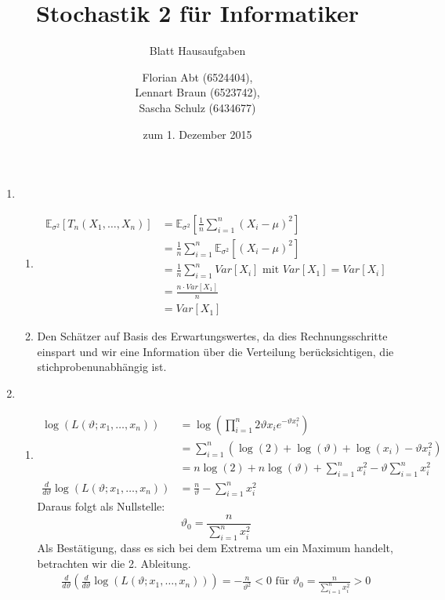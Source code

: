 \documentclass[a4paper]{scrartcl}
\title{Stochastik 2 für Informatiker}
\subtitle{Blatt {\blattnr} Hausaufgaben}
\author{
    Florian Abt (6524404), \\
    Lennart Braun (6523742), \\
    Sascha Schulz (6434677)
}
\date{zum 1. Dezember 2015}
\def \blattnr {7}
\begin{document}
\maketitle

\begin{enumerate}[label=\bfseries \blattnr.\arabic*]


\item 
\begin{enumerate}
\item 
\begin{equation*}
 \begin{split}
    \mathbb{E}_{\sigma^2}[T_n(X_1,\ldots,X_n)]
    &= \mathbb{E}_{\sigma^2}\left[\frac1n \sum_{i=1}^n(X_i-\mu)^2\right] \\
    &= \frac1n \sum_{i=1}^n \mathbb{E}_{\sigma^2} [(X_i-\mu)^2] \\
    &= \frac1n \sum_{i=1}^n Var[X_i] \text{ mit } Var[X_1]=Var[X_i] \\
    &= \frac{n \cdot Var[X_1]}n \\
    &= Var[X_1]
  \end{split}
\end{equation*}

\item 
  Den Schätzer auf Basis des Erwartungswertes, da dies Rechnungsschritte einspart und wir eine
  Information über die Verteilung berücksichtigen, die stichprobenunabhängig ist.
\end{enumerate}

\item 
\begin{enumerate}
\item 

\begin{equation*}
 \begin{split}
   \log \left( L(\vartheta;x_1,\ldots,x_n) \right)
   &= \log \left( \prod_{i=1}^n 2\vartheta x_i e^{-\vartheta x_i^2} \right) \\
   &= \sum_{i=1}^n \left( \log(2) + \log(\vartheta) + \log(x_i) -\vartheta x_i^2 \right) \\
   &= n\log(2) + n\log(\vartheta) + \sum_{i=1}^n x_i^2 - \vartheta \sum_{i=1}^n x_i^2 \\   
   \frac{d}{d\vartheta} \log \left( L(\vartheta;x_1,\ldots,x_n) \right)
   &= \frac{n}\vartheta - \sum_{i=1}^n x_i^2
  \end{split}
\end{equation*}
Daraus folgt als Nullstelle:
\begin{equation*}
\vartheta_0 = \frac{n}{\sum_{i=1}^n x_i^2} 
\end{equation*}
Als Bestätigung, dass es sich bei dem Extrema um ein Maximum handelt, betrachten wir die 2. Ableitung.
\begin{equation*}
 \begin{split} 
   \frac{d}{d\vartheta} \left( \frac{d}{d\vartheta} \log \left( L(\vartheta;x_1,\ldots,x_n) \right) \right)
   = -\frac{n}{\vartheta^2}
   < 0 \text{ für } \vartheta_0 = \frac{n}{\sum_{i=1}^n x_i^2} > 0
  \end{split}
\end{equation*}


\end{enumerate}
\end{enumerate}
\end{document}
